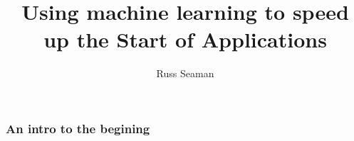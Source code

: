\documentclass[11pt]{beamer}
\begin{document}
	\author{Russ Seaman}
	\title{Using machine learning to speed up the Start of Applications}
	\subject{CSCI599 | Senior Seminar}
\begin{frame}[plain]
	\maketitle
\end{frame}

\begin{frame}
	\frametitle{An intro to the begining}
\end{frame}
\end{document}

